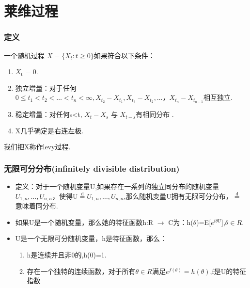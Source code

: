 \documentclass{beamer}
\begin{document}
	
\section{莱维过程}

\begin{frame}
\frametitle{定义}
一个随机过程 ${X=\{X_{t}:t\geq 0\}}$如果符合以下条件： 
\begin{enumerate}[(1)]
\item $X_{0}=0$.
\item 独立增量：对于任何$0\leq t_{1} < t_{2} < \dots < t_{n} < \infty ,X_{t_2}-X_{t_1},X_{t_3}-X_{t_2},\dots，X_{t_n}-X_{t_{n-1}}$相互独立.
\item 稳定增量：对任何s<t, $X_{t}-X_{s}$ 与 $X_{t-s}$有相同分布 .  
\item X几乎确定是右连左极.
\end{enumerate}
我们把X称作levy过程.
\end{frame}

\begin{frame}
\frametitle{无限可分分布(infinitely divisible distribution)}
\begin{itemize}
\item 定义：对于一个随机变量U,如果存在一系列的独立同分布的随机变量$U_{1,n},\dots,U_{n,n}$，使得U$\overset{\text{d}}{=}U_{1,n},\dots,U_{n,n}$,那么随机变量U拥有无限可分分布，$\overset{\text{d}}{=}$意味着同分布.
\item 如果U是一个随机变量，那么她的特征函数h:R $\to$ C为：h($\theta$)=E[$e^{i\theta U}$],$\theta \in R$.
\item U是一个无限可分随机变量，h是特征函数，那么：
\begin{enumerate}[(1)]
\item h是连续并且非0的,h(0)=1.
\item 存在一个独特的连续函数，对于所有$\theta \in R$满足$e^{f(\theta)}=h(\theta)$,f是U的特征指数
\end{enumerate}
\end{itemize}
\end{frame}
\end{document}
